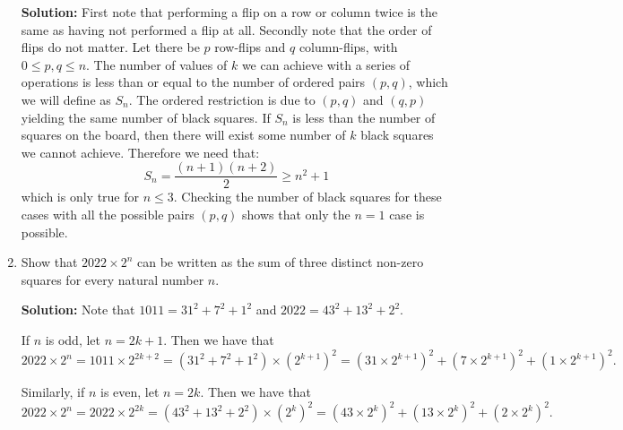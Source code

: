 \documentclass{article}
\begin{document}
\begin{enumerate}[itemsep=24pt]
\textbf{Solution:}
First note that performing a flip on a row or column twice is the same as having not performed a flip at all.
Secondly note that the order of flips do not matter.
Let there be $p$ row-flips and $q$ column-flips, with $0\leq p,q\leq n$.
The number of values of $k$ we can achieve with a series of operations is less than or equal to the number of ordered pairs $(p,q)$, which we will define as $S_n$.
The ordered restriction is due to $(p,q)$ and $(q,p)$ yielding the same number of black squares.
If $S_n$ is less than the number of squares on the board, then there will exist some number of $k$ black squares we cannot achieve.
Therefore we need that:
$$S_n = \frac{(n+1)(n+2)}{2} \geq n^2 + 1$$
which is only true for $n\leq3$.
Checking the number of black squares for these cases with all the possible pairs $(p,q)$ shows that only the $n=1$ case is possible.


\item
Show that $2022 \times 2^n$ can be written as the sum of three distinct non-zero squares for every natural number $n$.

\textbf{Solution:}
Note that $1011 = 31^2 + 7^2 + 1^2$ and $2022 = 43^2 + 13^2 + 2^2$.

If $n$ is odd, let $n = 2k + 1$. Then we have that
\[
    2022 \times 2^n = 1011 \times 2^{2k + 2} = \left( 31^2 + 7^2 + 1^2 \right) \times {\left( 2^{k + 1} \right)}^2 = {\left( 31 \times 2^{k + 1} \right)}^2 + {\left( 7 \times 2^{k + 1} \right)}^2 + {\left( 1 \times 2^{k + 1} \right)}^2.
\]

Similarly, if $n$ is even, let $n = 2k$. Then we have that
\[
    2022 \times 2^n = 2022 \times 2^{2k} = \left( 43^2 + 13^2 + 2^2 \right) \times {\left( 2^{k} \right)}^2 = {\left( 43 \times 2^{k} \right)}^2 + {\left( 13 \times 2^{k} \right)}^2 + {\left( 2 \times 2^{k} \right)}^2.
\]

\end{enumerate}
\end{document}
